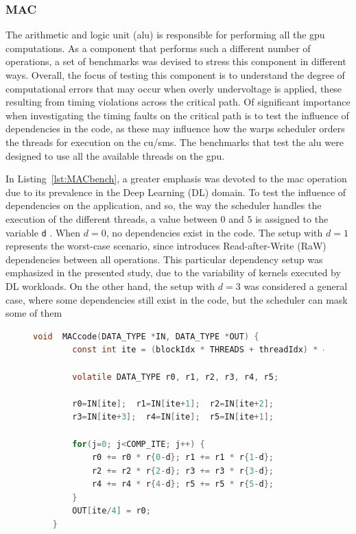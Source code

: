 \subsubsection{MAC}

The arithmetic and logic unit (\acrshort{alu}) is responsible for performing all the \acrshort{gpu} computations.  As a component that performs such a different number of operations, a set of benchmarks was devised to stress this component in different ways. Overall, the focus of testing this component is to understand the degree of computational errors that may occur when overly undervoltage is applied, these resulting from timing violations across the critical path. Of significant importance when investigating the timing faults on the critical path is to test the influence of dependencies in the code, as these may influence how the warps scheduler orders the threads for execution on the \acrshort{cu}/\acrshort{sm}s. The benchmarks that test the \acrshort{alu} were designed to use all the available threads on the \acrshort{gpu}.

In Listing~\ref{lst:MACbench}, a greater emphasis was devoted to the \acrshort{mac} operation due to its prevalence in the Deep Learning (DL) domain. To test the influence of dependencies on the application, and so, the way the scheduler handles the execution of the different threads, a value between $0$ and $5$ is assigned to the variable \texttt{d} . When $d=0$, no dependencies exist in the code. The setup with $d=1$ represents the worst-case scenario, since introduces Read-after-Write (RaW) dependencies between all operations. This particular dependency setup was emphasized in the presented study, due to the variability of kernels executed by DL workloads. On the other hand, the setup with $d=3$ was considered a general case, where some dependencies still exist in the code, but the scheduler can mask some of them



\begin{figure}[htpb]
    \begin{lstlisting}[language=C, caption=MAC Benchmark Code, label=lst:MACbench, basicstyle=\footnotesize\ttfamily, abovecaptionskip=0pt, captionpos=b]
    void  MACcode(DATA_TYPE *IN, DATA_TYPE *OUT) {
        const int ite = (blockIdx * THREADS + threadIdx) * 4;
        
        volatile DATA_TYPE r0, r1, r2, r3, r4, r5;
        
        r0=IN[ite];  r1=IN[ite+1];  r2=IN[ite+2]; 
        r3=IN[ite+3];  r4=IN[ite];  r5=IN[ite+1];
        
        for(j=0; j<COMP_ITE; j++) {
            r0 += r0 * r{0-d}; r1 += r1 * r{1-d}; 
            r2 += r2 * r{2-d}; r3 += r3 * r{3-d}; 
            r4 += r4 * r{4-d}; r5 += r5 * r{5-d};
        }
        OUT[ite/4] = r0;
    }
    \end{lstlisting}
\end{figure}


